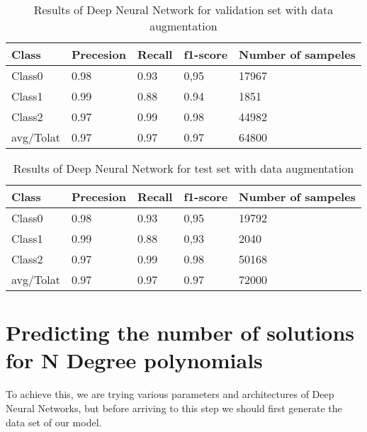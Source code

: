 \documentclass[a4paper,UKenglish]{lipics-v2016}
\begin{document}
 \begin{table}
 \caption{Results of Deep Neural Network for validation set with data augmentation}
 \small
 \begin{center}
 \setlength{\tabcolsep}{0.8em}
 \renewcommand{\arraystretch}{1.5}
 \begin{tabular}{|p{1cm}|p{ 1cm}|p{1cm}|p{1.5cm}|p{1.5cm}|}
 \hline
 {Class} & {Precesion}  & {Recall} & {f1-score}& {Number of sampeles}\\
 \hline
 Class0 & 0.98 & 0.93 & 0,95 & 17967\\
 \hline
 Class1 & 0.99& 0.88& 0.94& 1851\\
 \hline
 Class2 &0.97 & 0.99 & 0.98& 44982\\
 \hline
 avg/Tolat & 0.97 & 0.97  & 0.97 & 64800\\
 \hline
 \end{tabular}
 \end{center}
 \label{table:characteristics5}
 \vspace{-5mm}
 \end{table}


 \begin{table}
 \caption{Results of Deep Neural Network for test set with data augmentation}
 \small
 \begin{center}
 \setlength{\tabcolsep}{0.8em}
 \renewcommand{\arraystretch}{1.5}
 \begin{tabular}{|p{1cm}|p{ 1cm}|p{1cm}|p{1.5cm}|p{1.5cm}|}
 \hline
 {Class} & {Precesion}  & {Recall} & {f1-score}& {Number of sampeles}\\
 \hline
 Class0 & 0.98 & 0.93 & 0,95 & 19792\\
 \hline
 Class1 & 0.99& 0.88 & 0,93 & 2040\\
 \hline
 Class2 & 0.97 & 0.99  & 0.98& 50168\\
 \hline
 avg/Tolat & 0.97 & 0.97  & 0.97 & 72000\\
 \hline
 \end{tabular}
 \end{center}
 \label{table:characteristics6}
 \vspace{-5mm}
 \end{table}

 \section{Predicting the number of solutions for N Degree polynomials \label{section3}}
 To achieve this, we are trying various parameters and architectures of Deep Neural Networks, but before arriving to this step we should first generate the data set of our model.
\end{document}
